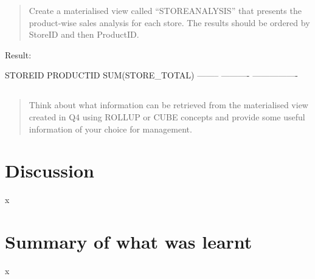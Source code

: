 \documentclass[
  12pt,
  a4paper,
]{article}
\begin{document}
\begin{quote}
Create a materialised view called ``STOREANALYSIS'' that presents the
product-wise sales analysis for each store. The results should be
ordered by StoreID and then ProductID.
\end{quote}

Result:

STOREID PRODUCTID SUM(STORE\_TOTAL) -------- ---------- ----------------

\hypertarget{section-4}{%
\subsection{}\label{section-4}}

\begin{quote}
Think about what information can be retrieved from the materialised view
created in Q4 using ROLLUP or CUBE concepts and provide some useful
information of your choice for management.
\end{quote}

\renewcommand*{\thesubsection}{\oldsubsection}

\hypertarget{discussion}{%
\section{Discussion}\label{discussion}}

x

\hypertarget{summary-of-what-was-learnt}{%
\section{Summary of what was learnt}\label{summary-of-what-was-learnt}}

x

\printbibliography
\end{document}
